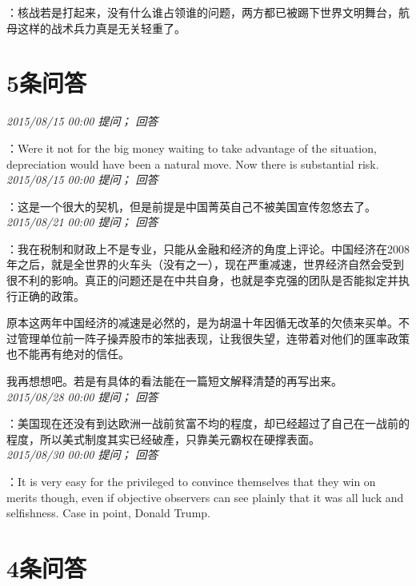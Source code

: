\documentclass[twocolumn]{ctexart}
\begin{document}
：核战若是打起来，没有什么谁占领谁的问题，两方都已被踢下世界文明舞台，航母这样的战术兵力真是无关轻重了。\\

\section{5条问答}

\textit{\hfill\noindent\small 2015/08/15 00:00 提问； 回答}

：Were it not for the big money waiting to take advantage of the situation, depreciation would have been a natural move. Now there is substantial risk.\\

\textit{\hfill\noindent\small 2015/08/15 00:00 提问； 回答}

：这是一个很大的契机，但是前提是中国菁英自己不被美国宣传忽悠去了。\\

\textit{\hfill\noindent\small 2015/08/21 00:00 提问； 回答}

：我在税制和财政上不是专业，只能从金融和经济的角度上评论。中国经济在2008年之后，就是全世界的火车头（没有之一），现在严重减速，世界经济自然会受到很不利的影响。真正的问题还是在中共自身，也就是李克强的团队是否能拟定并执行正确的政策。

原本这两年中国经济的减速是必然的，是为胡温十年因循无改革的欠债来买单。不过管理单位前一阵子操弄股市的笨拙表现，让我很失望，连带着对他们的匯率政策也不能再有绝对的信任。

我再想想吧。若是有具体的看法能在一篇短文解释清楚的再写出来。\\

\textit{\hfill\noindent\small 2015/08/28 00:00 提问； 回答}

：美国现在还没有到达欧洲一战前贫富不均的程度，却已经超过了自己在一战前的程度，所以美式制度其实已经破產，只靠美元霸权在硬撑表面。\\

\textit{\hfill\noindent\small 2015/08/30 00:00 提问； 回答}

：It is very easy for the privileged to convince themselves that they win on merits though, even if objective observers can see plainly that it was all luck and selfishness. Case in point, Donald Trump.\\

\section{4条问答}
\end{document}

